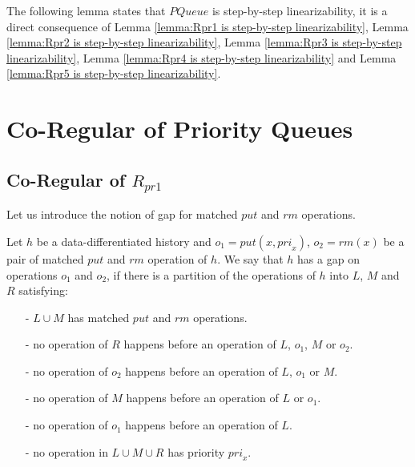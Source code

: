 The following lemma states that $\textit{PQueue}$ is step-by-step linearizability, it is a direct consequence of Lemma \ref{lemma:Rpr1 is step-by-step linearizability}, Lemma \ref{lemma:Rpr2 is step-by-step linearizability}, Lemma \ref{lemma:Rpr3 is step-by-step linearizability}, Lemma \ref{lemma:Rpr4 is step-by-step linearizability} and Lemma \ref{lemma:Rpr5 is step-by-step linearizability}.







\section{Co-Regular of Priority Queues}
\label{sec:co-regular of priority queues}




\subsection{Co-Regular of $R_{\textit{pr1}}$}
\label{subsec:co-regular of Rpr1}

Let us introduce the notion of gap for matched $\textit{put}$ and $\textit{rm}$ operations.

\begin{definition}\label{def:gap for matched put and rm operations}

Let $h$ be a data-differentiated history and $o_1 = \textit{put}(x,\textit{pri}_x)$, $o_2 = \textit{rm}(x)$ be a pair of matched $\textit{put}$ and $\textit{rm}$ operation of $h$. We say that $h$ has a gap on operations $o_1$ and $o_2$, if there is a partition of the operations of $h$ into $L$, $M$ and $R$ satisfying:
\begin{itemize}
\setlength{\itemsep}{0.5pt}
\item[-] $L \cup M$ has matched $\textit{put}$ and $\textit{rm}$ operations.

\item[-] no operation of $R$ happens before an operation of $L$, $o_1$, $M$ or $o_2$.

\item[-] no operation of $o_2$ happens before an operation of $L$, $o_1$ or $M$.

\item[-] no operation of $M$ happens before an operation of $L$ or $o_1$.

\item[-] no operation of $o_1$ happens before an operation of $L$.

\item[-] no operation in $L \cup M \cup R$ has priority $\textit{pri}_x$.
\end{itemize}
\end{definition}

